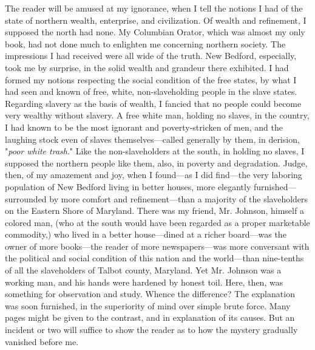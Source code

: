 The reader will be amused at my ignorance, when I tell the notions I had
of the state of northern wealth, enterprise, and civilization. Of wealth
and refinement, I supposed the north had none. My Columbian Orator,
which was almost my only book, had not done much to enlighten me
concerning northern society. The impressions I had received were all
wide of the truth. New Bedford, especially, took me by surprise, in the
solid wealth and grandeur there {}exhibited. I had formed my notions
respecting the social condition of the free states, by what I had seen
and known of free, white, non-slaveholding people in the slave states.
Regarding slavery as the basis of wealth, I fancied that no people could
become very wealthy without slavery. A free white man, holding no
slaves, in the country, I had known to be the most ignorant and
poverty-stricken of men, and the laughing stock even of slaves
themselves---called generally by them, in derision, "\emph{poor white
trash}." Like the non-slaveholders at the south, in holding no slaves, I
supposed the northern people like them, also, in poverty and
degradation. Judge, then, of my amazement and joy, when I found---as I
did find---the very laboring population of New Bedford living in better
houses, more elegantly furnished---surrounded by more comfort and
refinement---than a majority of the slaveholders on the Eastern Shore of
Maryland. There was my friend, Mr. Johnson, himself a colored man, (who
at the south would have been regarded as a proper marketable commodity,)
who lived in a better house---dined at a richer board---was the owner of
more books---the reader of more newspapers---was more conversant with
the political and social condition of this nation and the world---than
nine-tenths of all the slaveholders of Talbot county, Maryland. Yet Mr.
Johnson was a working man, and his hands were hardened by honest toil.
Here, then, was something for observation and study. Whence the
difference? The explanation was soon furnished, in the superiority of
mind over simple brute force. Many pages might be given to the contrast,
and in {}explanation of its causes. But an incident or two will suffice
to show the reader as to how the mystery gradually vanished before me.

